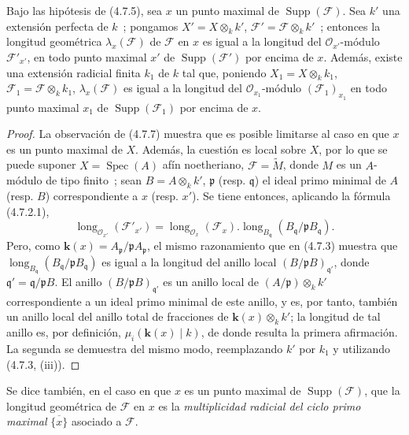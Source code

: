 \begin{proposition}[4.7.8]
\label{IV.2.4.7.8-fr}
Bajo las hipótesis de \textup{(4.7.5)}, sea $x$ un punto maximal de
$\operatorname{Supp}(\mathscr F)$. Sea $k'$ una extensión perfecta de $k$~;
pongamos $X'=X\otimes_k k'$, $\mathscr F'=\mathscr F\otimes_k k'$~; entonces la
longitud geométrica $\lambda_x(\mathscr F)$ de $\mathscr F$ en $x$ es igual a la
longitud del $\mathcal O_{x'}$-módulo $\mathscr F'_{x'}$, en todo punto maximal
$x'$ de $\operatorname{Supp}(\mathscr F')$ por encima de $x$. Además, existe una
extensión radicial finita $k_1$ de $k$ tal que, poniendo
$X_1=X\otimes_k k_1$, $\mathscr F_1=\mathscr F\otimes_k k_1$,
$\lambda_x(\mathscr F)$ es igual a la longitud del
$\mathcal O_{x_1}$-módulo $(\mathscr F_1)_{x_1}$ en todo punto maximal $x_1$ de
$\operatorname{Supp}(\mathscr F_1)$ por encima de $x$.
\end{proposition}

\begin{proof}
La observación de (4.7.7) muestra que es posible limitarse al caso en que $x$ es
un punto maximal de $X$. Además, la cuestión es local sobre $X$, por lo que
se puede suponer $X=\operatorname{Spec}(A)$ afín noetheriano,
$\mathscr F=\widetilde M$, donde $M$ es un $A$-módulo de tipo finito~; sean
$B=A\otimes_k k'$, $\mathfrak p$ (resp. $\mathfrak q$) el ideal primo minimal
de $A$ (resp. $B$) correspondiente a $x$ (resp. $x'$). Se tiene entonces,
aplicando la fórmula (4.7.2.1),
\[
\operatorname{long}_{\mathcal O_{x'}}(\mathscr F'_{x'})
=\operatorname{long}_{\mathcal O_x}(\mathscr F_x)
 .\operatorname{long}_{B_{\mathfrak q}}
 (B_{\mathfrak q}/\mathfrak pB_{\mathfrak q}).
\]
Pero, como $\boldsymbol{k}(x)=A_{\mathfrak p}/\mathfrak pA_{\mathfrak p}$, el mismo
razonamiento que en (4.7.3) muestra que
$\operatorname{long}_{B_{\mathfrak q}}
(B_{\mathfrak q}/\mathfrak pB_{\mathfrak q})$ es igual a la longitud del anillo
local $(B/\mathfrak pB)_{\mathfrak q'}$, donde
$\mathfrak q'=\mathfrak q/\mathfrak pB$. El anillo
$(B/\mathfrak pB)_{\mathfrak q'}$ es un anillo local de
$(A/\mathfrak p)\otimes_k k'$ correspondiente a un ideal primo minimal de este anillo, y es,
por tanto, también un anillo local del anillo total de fracciones de
$\boldsymbol{k}(x)\otimes_k k'$; la longitud de tal anillo es, por definición,
$\mu_i(\boldsymbol{k}(x)\mid k)$, de donde resulta la primera afirmación. La segunda se
demuestra del mismo modo, reemplazando $k'$ por $k_1$ y utilizando (4.7.3, (iii)).
\end{proof}

Se dice también, en el caso en que $x$ es un punto maximal de
$\operatorname{Supp}(\mathscr F)$, que la longitud geométrica de $\mathscr F$ en
$x$ es la \emph{multiplicidad radicial del ciclo primo maximal} $\overline{\{x\}}$
asociado a $\mathscr F$.

